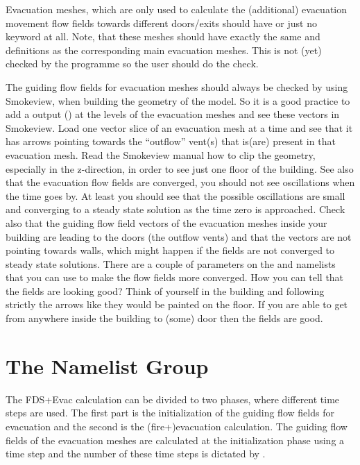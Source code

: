 \documentclass[12pt,a4paper,final,twoside]{stylevk}
\begin{document}
Evacuation meshes, which are only used to calculate the (additional)
evacuation movement flow fields towards different doors/exits should
have  or just no 
keyword at all.  Note, that these meshes should have exactly the same
 and  definitions as the corresponding main
evacuation meshes.  This is not (yet) checked by the programme so the
user should do the check.


The guiding flow fields for evacuation meshes should always be checked
by using Smokeview, when building the geometry of the model.  So it is
a good practice to add a  output () at the levels of the
evacuation meshes and see these vectors in Smokeview.  Load one vector
slice of an evacuation mesh at a time and see that it has arrows
pointing towards the ``outflow'' vent(s) that is(are) present in that
evacuation mesh.  Read the Smokeview manual how to clip the geometry,
especially in the z-direction, in order to see just one floor of the
building.  See also that the evacuation flow fields are converged, you
should not see oscillations when the time goes by.  At least you
should see that the possible oscillations are small and converging to
a steady state solution as the time zero is approached.  Check also
that the guiding flow field vectors of the evacuation meshes inside
your building are leading to the doors (the outflow vents) and that
the vectors are not pointing towards walls, which might happen if the
fields are not converged to steady state solutions.  There are a couple
of parameters on the  and  namelists that you
can use to make the flow fields more converged.  How you can tell that
the fields are looking good? Think of yourself in the building and
following strictly the arrows like they would be painted on the floor.
If you are able to get from anywhere inside the building to (some)
door then the fields are good.
 

\section{The  Namelist Group}\label{Sec_TimeNML}

The FDS+Evac calculation can be divided to two phases, where different
time steps are used.  The first part is the initialization of the
guiding flow fields for evacuation and the second is the
(fire+)evacuation calculation.  The guiding flow fields of the
evacuation meshes are calculated at the initialization phase using a
time step  and the number of these time
steps is dictated by .
\end{document}
